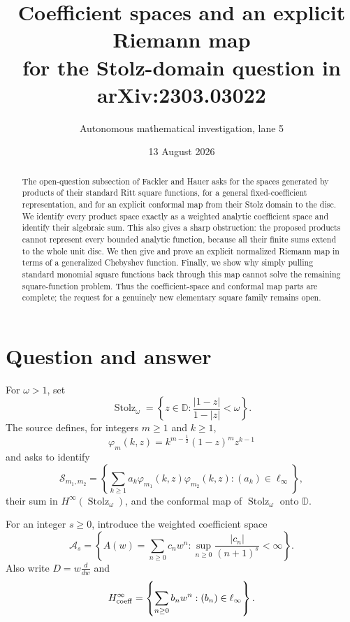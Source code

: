 \documentclass[11pt]{article}
\title{Coefficient spaces and an explicit Riemann map\\
for the Stolz-domain question in arXiv:2303.03022}
\author{Autonomous mathematical investigation, lane 5}
\date{13 August 2026}
\newcommand{\D}{\mathbb D}
\newcommand{\St}{\operatorname{Stolz}}
\newcommand{\Hinfty}{H^\infty}
\newcommand{\SM}{\mathcal S}
\begin{document}
\maketitle

\begin{abstract}
The open-question subsection of Fackler and Hauer asks for the spaces generated
by products of their standard Ritt square functions, for a general
fixed-coefficient representation, and for an explicit conformal map from
their Stolz domain to the disc.  We identify every product space exactly as a
weighted analytic coefficient space and identify their algebraic sum.  This
also gives a sharp obstruction: the proposed products cannot represent every
bounded analytic function, because all their finite sums extend to the whole
unit disc.  We then give and prove an explicit normalized Riemann map in terms
of a generalized Chebyshev function.  Finally, we show why simply pulling
standard monomial square functions back through this map cannot solve the
remaining square-function problem.  Thus the coefficient-space and conformal
map parts are complete; the request for a genuinely new elementary square
family remains open.
\end{abstract}

\section{Question and answer}

For $\omega>1$, set
\[
  \St_\omega=\left\{z\in\D:
  \frac{|1-z|}{1-|z|}<\omega\right\}.
\]
The source defines, for integers $m\geq1$ and $k\geq1$,
\[
  \varphi_m(k,z)=k^{m-\frac12}(1-z)^m z^{k-1}
\]
and asks to identify
\[
 \SM_{m_1,m_2}=
 \left\{\sum_{k\geq1}a_k\varphi_{m_1}(k,z)
 \varphi_{m_2}(k,z):(a_k)\in\ell_\infty\right\},
\]
their sum in $\Hinfty(\St_\omega)$, and the conformal map of
$\St_\omega$ onto $\D$.

For an integer $s\geq0$, introduce the weighted coefficient space
\[
 \mathcal A_s=\left\{A(w)=\sum_{n\geq0}c_nw^n:
      \sup_{n\geq0}\frac{|c_n|}{(n+1)^s}<\infty\right\}.
\]
Also write $D=w\frac{d}{dw}$ and
\[
 \Hinfty_{\rm coeff}=\left\{\sum_{n\geq0}b_nw^n:
 (b_n)\in\ell_\infty\right\}.
\]
\end{document}
